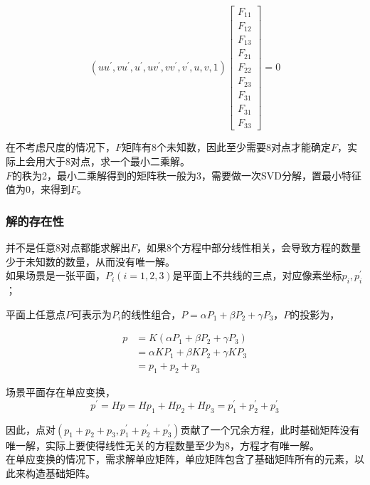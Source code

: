 	$$
		\left(uu^{\prime}, vu^{\prime}, u^{\prime}, uv^{\prime},vv^{\prime},v^{\prime},u,v,1\right)
		\begin{bmatrix*}
			F_{11}\\
			F_{12}\\
			F_{13}\\
			F_{21}\\
			F_{22}\\
			F_{23}\\
			F_{31}\\
			F_{31}\\
			F_{33}
		\end{bmatrix*} = 0
	$$

	在不考虑尺度的情况下，$F$矩阵有8个未知数，因此至少需要8对点才能确定$F$，实际上会用大于8对点，求一个最小二乘解。\\

	$F$的秩为2，最小二乘解得到的矩阵秩一般为3，需要做一次SVD分解，置最小特征值为0，来得到$F$。

	\subsubsection*{解的存在性}
		并不是任意8对点都能求解出$F$，如果8个方程中部分线性相关，会导致方程的数量少于未知数的数量，从而没有唯一解。\\

		如果场景是一张平面，$P_i(i=1,2,3)$是平面上不共线的三点，对应像素坐标$p_i,p^\prime_i$；

		平面上任意点$P$可表示为$P_i$的线性组合，$P=\alpha P_1 + \beta P_2 + \gamma P_3$，$P$的投影为，
		
		\begin{align*}
			p &= K\left(\alpha P_1 + \beta P_2 + \gamma P_3\right)\\
				&= \alpha KP_1 + \beta K P_2 + \gamma KP_3\\
				&= p_1 + p_2 + p_3
		\end{align*}

		场景平面存在单应变换，
		$$
			p^\prime = Hp = Hp_1 + Hp_2 + Hp_3 = p^\prime_1+p^\prime_2+p^\prime_3
		$$

		因此，点对$(p_1 + p_2 + p_3,p^\prime_1+p^\prime_2+p^\prime_3)$贡献了一个冗余方程，此时基础矩阵没有唯一解，实际上要使得线性无关的方程数量至少为8，方程才有唯一解。\\

		在单应变换的情况下，需求解单应矩阵，单应矩阵包含了基础矩阵所有的元素，以此来构造基础矩阵。\\


